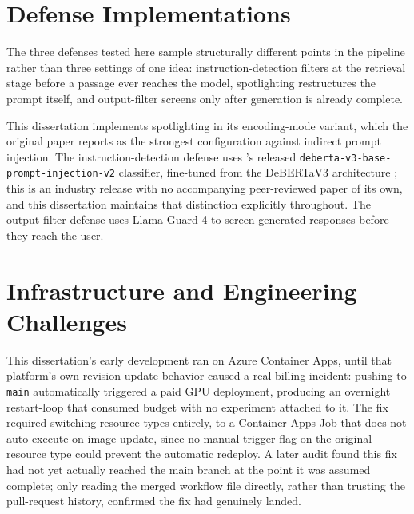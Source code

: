 \section{Defense Implementations}

The three defenses tested here sample structurally different points in
the pipeline rather than three settings of one idea: instruction-detection
filters at the retrieval stage before a passage ever reaches the model,
spotlighting restructures the prompt itself, and output-filter screens
only after generation is already complete.

This dissertation implements spotlighting \citep{hines2024defending} in
its encoding-mode variant, which the original paper reports as the
strongest configuration against indirect prompt injection. The
instruction-detection defense uses \citet{protectai2024deberta}'s
released \texttt{deberta-v3-base-prompt-injection-v2} classifier,
fine-tuned from the DeBERTaV3 architecture \citep{he2023debertav3}; this
is an industry release with no accompanying peer-reviewed paper of its
own, and this dissertation maintains that distinction explicitly
throughout. The output-filter defense uses Llama Guard 4
\citep{metaai2025llamaguard4} to screen generated responses before they
reach the user.

\section{Infrastructure and Engineering Challenges}

This dissertation's early development ran on Azure Container Apps,
until that platform's own revision-update behavior caused a real
billing incident: pushing to \texttt{main} automatically triggered a
paid GPU deployment, producing an overnight restart-loop that consumed
budget with no experiment attached to it. The fix required switching
resource types entirely, to a Container Apps Job that does not
auto-execute on image update, since no manual-trigger flag on the
original resource type could prevent the automatic redeploy. A later
audit found this fix had not yet actually reached the main branch at
the point it was assumed complete; only reading the merged workflow
file directly, rather than trusting the pull-request history, confirmed
the fix had genuinely landed.

